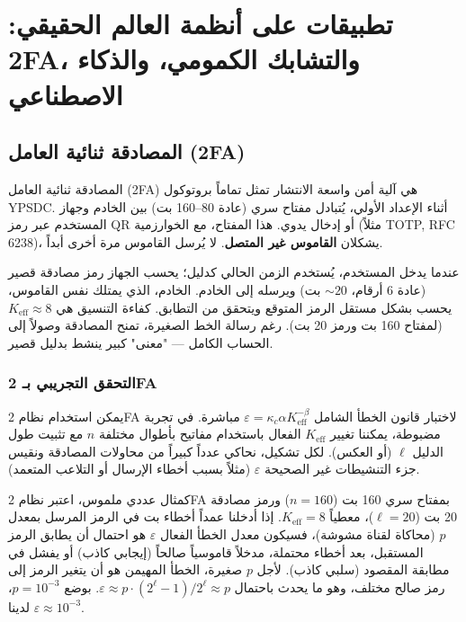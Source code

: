 \documentclass[12pt,a4paper]{article}
\newcommand{\Keff}{K_{\mathrm{eff}}}
\theoremstyle{remark}
\begin{document}
	\section{تطبيقات على أنظمة العالم الحقيقي: 2FA، والتشابك الكمومي، والذكاء الاصطناعي}
	\label{sec:applications}
	
	\subsection{المصادقة ثنائية العامل (2FA)}
	
	المصادقة ثنائية العامل (2FA) هي آلية أمن واسعة الانتشار تمثل تماماً بروتوكول YPSDC. أثناء الإعداد الأولي، يُتبادل مفتاح سري (عادة 80–160 بت) بين الخادم وجهاز المستخدم عبر رمز QR أو إدخال يدوي. هذا المفتاح، مع الخوارزمية (مثلاً TOTP, RFC 6238)، يشكلان \textbf{القاموس غير المتصل}. لا يُرسل القاموس مرة أخرى أبداً.
	
	عندما يدخل المستخدم، يُستخدم الزمن الحالي كدليل؛ يحسب الجهاز رمز مصادقة قصير (عادة 6 أرقام، \(\sim 20\) بت) ويرسله إلى الخادم. الخادم، الذي يمتلك نفس القاموس، يحسب بشكل مستقل الرمز المتوقع ويتحقق من التطابق. كفاءة التنسيق هي \(\Keff \approx 8\) (لمفتاح 160 بت ورمز 20 بت). رغم رسالة الخط الصغيرة، تمنح المصادقة وصولاً إلى الحساب الكامل — "معنى" كبير ينشط بدليل قصير.
	
	\subsubsection{التحقق التجريبي بـ 2FA}
	\label{subsec:2fa-experiment}
	
	يمكن استخدام نظام 2FA لاختبار قانون الخطأ الشامل \(\varepsilon = \kappa_c \alpha K_{\mathrm{eff}}^{-\beta}\) مباشرة. في تجربة مضبوطة، يمكننا تغيير \(\Keff\) الفعال باستخدام مفاتيح بأطوال مختلفة \(n\) مع تثبيت طول الدليل \(\ell\) (أو العكس). لكل تشكيل، نحاكي عدداً كبيراً من محاولات المصادقة ونقيس جزء التنشيطات غير الصحيحة \(\varepsilon\) (مثلاً بسبب أخطاء الإرسال أو التلاعب المتعمد).
	
	كمثال عددي ملموس، اعتبر نظام 2FA بمفتاح سري 160 بت (\(n=160\)) ورمز مصادقة 20 بت (\(\ell=20\))، معطياً \(\Keff = 8\). إذا أدخلنا عمداً أخطاء بت في الرمز المرسل بمعدل \(p\) (محاكاة لقناة مشوشة)، فسيكون معدل الخطأ الفعال \(\varepsilon\) هو احتمال أن يطابق الرمز المستقبل، بعد أخطاء محتملة، مدخلاً قاموسياً صالحاً (إيجابي كاذب) أو يفشل في مطابقة المقصود (سلبي كاذب). لأجل \(p\) صغيرة، الخطأ المهيمن هو أن يتغير الرمز إلى رمز صالح مختلف، وهو ما يحدث باحتمال \(\varepsilon \approx p \cdot (2^\ell -1)/2^\ell \approx p\). بوضع \(p = 10^{-3}\)، لدينا \(\varepsilon \approx 10^{-3}\).
	
\end{document}
